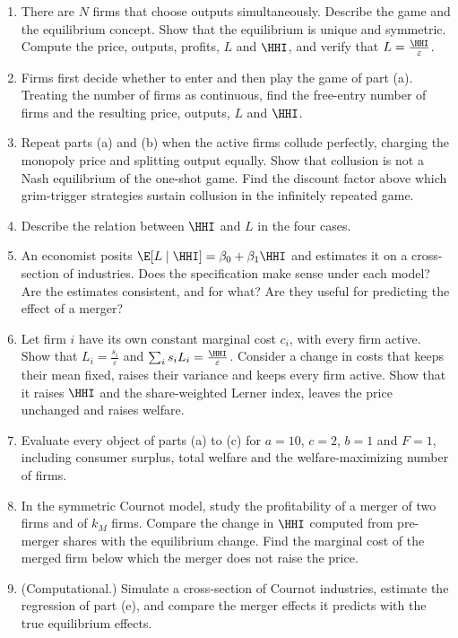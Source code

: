 \begin{enumerate}[label=(\alph*)]
\item There are $N$ firms that choose outputs simultaneously. Describe the game and the equilibrium concept.
  Show that the equilibrium is unique and symmetric. Compute the price, outputs, profits, $L$ and $\HHI$, and
  verify that $L = \frac{\HHI}{\varepsilon}$.
\item Firms first decide whether to enter and then play the game of part (a). Treating the number of firms as
  continuous, find the free-entry number of firms and the resulting price, outputs, $L$ and $\HHI$.
\item Repeat parts (a) and (b) when the active firms collude perfectly, charging the monopoly price and
  splitting output equally. Show that collusion is not a Nash equilibrium of the one-shot game. Find the
  discount factor above which grim-trigger strategies sustain collusion in the infinitely repeated game.
\item Describe the relation between $\HHI$ and $L$ in the four cases.
\item An economist posits $\E[L \mid \HHI] = \beta_0 + \beta_1\HHI$ and estimates it on a cross-section of industries.
  Does the specification make sense under each model? Are the estimates consistent, and for what? Are they
  useful for predicting the effect of a merger?
\item Let firm $i$ have its own constant marginal cost $c_i$, with every firm active. Show that
  $L_i = \frac{s_i}{\varepsilon}$ and $\sum_i s_iL_i = \frac{\HHI}{\varepsilon}$. Consider a change in costs that
  keeps their mean fixed, raises their variance and keeps every firm active. Show that it raises $\HHI$ and the
  share-weighted Lerner index, leaves the price unchanged and raises welfare.
\item Evaluate every object of parts (a) to (c) for $a = 10$, $c = 2$, $b = 1$ and $F = 1$, including consumer
  surplus, total welfare and the welfare-maximizing number of firms.
\item In the symmetric Cournot model, study the profitability of a merger of two firms and of $k_M$ firms.
  Compare the change in $\HHI$ computed from pre-merger shares with the equilibrium change. Find the marginal
  cost of the merged firm below which the merger does not raise the price.
\item (Computational.) Simulate a cross-section of Cournot industries, estimate the regression of part (e),
  and compare the merger effects it predicts with the true equilibrium effects.
\end{enumerate}

